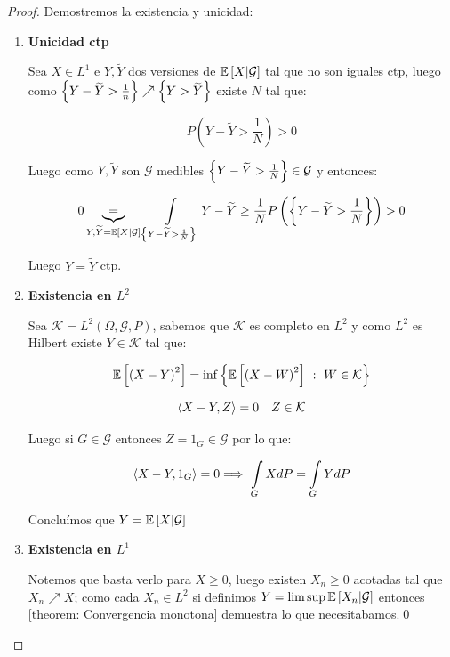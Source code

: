 \begin{proof}
	Demostremos la existencia y unicidad:
	
	\begin{enumerate}
		\item {\textbf{Unicidad ctp}}
		
		Sea $X \in L^1$ e $Y,\widetilde{Y}$ dos versiones de $\mathbb{E} \left[X \vert \mathcal{G}\right]$ tal que no son iguales ctp, luego como $\left\lbrace Y - \widetilde{Y} > \frac{1}{n}\right\rbrace \nearrow \left\lbrace Y > \widetilde{Y}\right\rbrace$ existe $N$ tal que:
		
		\begin{equation*}
			P\left(Y - \widetilde{Y} > \frac{1}{N}\right) > 0
		\end{equation*}
		
		Luego como $Y, \widetilde{Y}$ son $\mathcal{G}$ medibles $\left\lbrace Y - \widetilde{Y} > \frac{1}{N}\right\rbrace \in \mathcal{G}$ y entonces:
		
		\begin{equation*}
			0 \underbrace{=}_{Y,\widetilde{Y} = \mathbb{E} \left[X \vert \mathcal{G}\right]} \int\limits_{\left\lbrace Y - \widetilde{Y} > \frac{1}{N}\right\rbrace} {Y - \widetilde{Y}} \geq \frac{1}{N} P \left(\left\lbrace Y - \widetilde{Y} > \frac{1}{N}\right\rbrace\right) > 0
		\end{equation*}
		
		Luego $Y = \widetilde{Y}$ ctp.
		
		\item {\textbf{Existencia en $L^2$}}
		
		Sea $\mathcal{K} = L^2(\Omega, \mathcal{G}, P)$, sabemos que $\mathcal{K} $ es completo en $L^2$ y como $L^2$ es Hilbert existe $Y \in \mathcal{K} $ tal que:
		
		\begin{equation*}
			\mathbb{E} \left[\left(X - Y \right)^2\right] = \inf \left\lbrace\mathbb{E} \left[\left(X - W \right)^2\right] ~:~ W \in \mathcal{K}\right\rbrace
		\end{equation*}
		
		\begin{equation*}
			\left\langle X-Y, Z\right\rangle = 0 \quad Z \in \mathcal{K}
		\end{equation*}
		
		Luego si $G \in \mathcal{G}$ entonces $Z = 1_{G} \in \mathcal{G}$ por lo que:
		
		\begin{equation*}
			\ip{X-Y, 1_G} = 0 \Longrightarrow \ \int\limits_{G} {XdP} = \int\limits_{G}{Y dP}
		\end{equation*}
		
		Conclu\'imos que $Y = \mathbb{E} \left[X \vert \mathcal{G}\right]$
		
		\item {\textbf{Existencia en $L^1$}}		
		
		Notemos que basta verlo para $X \geq 0$, luego existen $X_n \geq 0$ acotadas tal que $X_n \nearrow X$; como cada $X_n \in L^2$ si definimos $Y = \limsup \mathbb{E} \left[X_n \vert \mathcal{G}\right]$ entonces \ref{theorem: Convergencia monotona} demuestra lo que necesitabamos.\qed
		
	\end{enumerate}
	
\end{proof}

